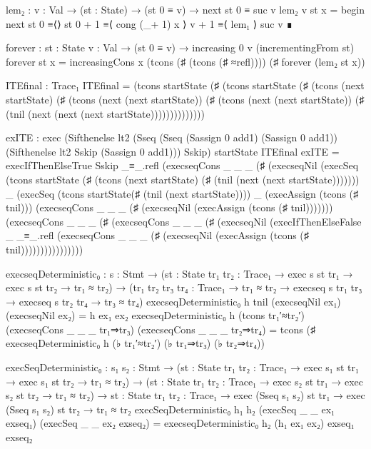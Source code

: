                 lem₂ : {v : Val} → (st : State) → (st 0 ≡ v) → next st 0 ≡ suc v
                lem₂ {v} st x = begin
                    next st 0
                    ≡⟨⟩
                    st 0 + 1
                    ≡⟨ cong (_+ 1) x ⟩
                    v + 1
                    ≡⟨ lem₁ ⟩
                    suc v
                    ∎

                forever : {st : State} {v : Val} → (st 0 ≡ v) → increasing 0 v (incrementingFrom st)
                forever {st} x = increasingCons x (tcons (♯ (tcons (♯ ≈refl)))) (♯ forever (lem₂ st x))

        ITEfinal : Trace₁
        ITEfinal = (tcons startState (♯ (tcons startState (♯ (tcons (next startState) (♯ (tcons (next (next startState)) (♯ (tcons (next (next startState)) (♯ (tnil (next (next (next startState))))))))))))))

        exITE : exec 
            (Sifthenelse 
                lt2 
                (Sseq 
                    (Sseq (Sassign 0 add1) (Sassign 0 add1)) 
                    (Sifthenelse lt2 Sskip (Sassign 0 add1))) 
                Sskip) 
            startState 
            ITEfinal
        exITE = execIfThenElseTrue 
            Sskip 
            _≡_.refl 
            (execseqCons _ _ _ (♯ (execseqNil (execSeq 
                (tcons startState (♯ (tcons (next startState) (♯ (tnil (next (next startState))))))) _ 
                (execSeq (tcons startState(♯ (tnil (next startState)))) _ (execAssign (tcons (♯ tnil))) (execseqCons _ _ _ (♯ (execseqNil (execAssign (tcons (♯ tnil))))))) 
                (execseqCons _ _ _ (♯ (execseqCons _ _ _ (♯ (execseqNil (execIfThenElseFalse _ _≡_.refl (execseqCons _ _ _ (♯ (execseqNil (execAssign (tcons (♯ tnil)))))))))))))))) 
                

            

    execseqDeterministic₀ : {s : Stmt}
        → ({st : State} {tr₁ tr₂ : Trace₁} → exec s st tr₁ → exec s st tr₂ → tr₁ ≈ tr₂) 
        → ({tr₁ tr₂ tr₃ tr₄ : Trace₁} → tr₁ ≈ tr₂ → execseq s tr₁ tr₃ → execseq s tr₂ tr₄ → tr₃ ≈ tr₄)
    execseqDeterministic₀ h tnil              (execseqNil ex₁)         (execseqNil ex₂)         = h ex₁ ex₂
    execseqDeterministic₀ h (tcons tr₁′≈tr₂′) (execseqCons _ _ _ tr₁⇒tr₃) (execseqCons _ _ _ tr₂⇒tr₄) = tcons (♯ execseqDeterministic₀ h (♭ tr₁′≈tr₂′) (♭ tr₁⇒tr₃) (♭ tr₂⇒tr₄))

    execSeqDeterministic₀ : {s₁ s₂ : Stmt} 
        → ({st : State} {tr₁ tr₂ : Trace₁} → exec s₁ st tr₁ → exec s₁ st tr₂ → tr₁ ≈ tr₂)
        → ({st : State} {tr₁ tr₂ : Trace₁} → exec s₂ st tr₁ → exec s₂ st tr₂ → tr₁ ≈ tr₂)
        → {st : State} {tr₁ tr₂ : Trace₁} → exec (Sseq s₁ s₂) st tr₁ → exec (Sseq s₁ s₂) st tr₂ → tr₁ ≈ tr₂
    execSeqDeterministic₀ h₁ h₂ (execSeq _ _ ex₁ exseq₁) (execSeq _ _ ex₂ exseq₂) = execseqDeterministic₀ h₂ (h₁ ex₁ ex₂) exseq₁ exseq₂

